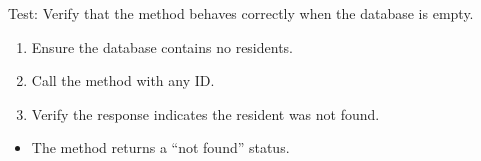 \documentclass[letterpaper,10pt,english]{sphinxmanual}
\begin{document}
\begin{fulllineitems}
\label{\detokenize{test:test.test_residetnt.test_delete_resident_empty_database}}
\pysigstartsignatures
\pysiglinewithargsret
{}
{}
{}
\pysigstopsignatures
\sphinxAtStartPar
Test: Verify that the method behaves correctly when the database is empty.
\begin{description}
\begin{enumerate}
%
\item {} 
\sphinxAtStartPar
Ensure the database contains no residents.

\item {} 
\sphinxAtStartPar
Call the  method with any ID.

\item {} 
\sphinxAtStartPar
Verify the response indicates the resident was not found.

\end{enumerate}

\begin{itemize}
\item {} 
\sphinxAtStartPar
The method returns a “not found” status.

\end{itemize}

\end{description}

\end{fulllineitems}

\end{document}
